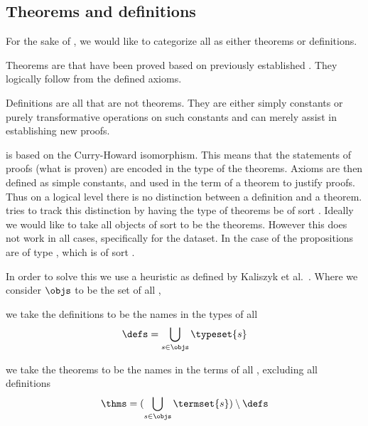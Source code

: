 \subsection{Theorems and definitions}
\label{section:thmsdefs}

For the sake of \premiseselection, we would like to categorize all \coqobjs as either theorems or definitions.
\begin{definition}[theorem]
    Theorems are \coqobjs that have been proved based on previously established \coqobjs.
    They logically follow from the defined axioms.
\end{definition}

\begin{definition}[definition]
    Definitions are all \coqobjs that are not theorems.
    They are either simply constants or purely transformative operations on such constants
    and can merely assist in establishing new proofs.
\end{definition}

\coq is based on the Curry-Howard isomorphism.
This means that the statements of proofs (what is proven) are encoded in the type of the theorems.
Axioms are then defined as simple constants, and used in the term of a theorem to justify proofs.
Thus on a logical level there is no distinction between a definition and a theorem.
\coq tries to track this distinction by having the type of theorems be of sort \sortprop.
Ideally we would like to take all objects of sort \sortprop to be the theorems.
However this does not work in all cases, specifically for the \corn dataset.
In the case of \corn the propositions are of type \cprop, which is of sort \sorttype.

In order to solve this we use a heuristic as defined by Kaliszyk et al.\ \cite{kaliszyk2014machine}.
Where we consider $\objs$ to be the set of all \coqobjs,

\begin{definition}\label{def:defs}
  we take the definitions to be the names in the types of all \coqobjs
  \[ \defs = \bigcup_{s \in \objs} \typeset{s} \]
\end{definition}

\begin{definition}\label{def:thms}
  we take the theorems to be the names in the terms of all \coqobj, excluding all definitions
  \[ \thms = (\bigcup_{s \in \objs} \termset{s}) \setminus \defs \]
\end{definition}

